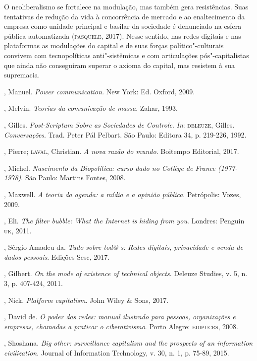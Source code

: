 O neoliberalismo se fortalece na modulação, mas também gera
resistências. Suas tentativas de redução da vida à concorrência de
mercado e ao enaltecimento da empresa como unidade principal e basilar
da sociedade é denunciado na esfera pública automatizada (\textsc{pasquele},
2017). Nesse sentido, nas redes digitais e nas plataformas as modulações
do capital e de suas forças político"-culturais convivem com
tecnopolíticas anti"-sistêmicas e com articulações pós"-capitalistas que
ainda não conseguiram superar o axioma do capital, mas resistem à sua
supremacia.

\begin{bibliohedra}
, Manuel. \emph{Power communication.} New York: Ed. Oxford,
2009.

, Melvin. \emph{Teorias da comunicação de massa}. Zahar, 1993.

, Gilles. \emph{Post-Scriptum Sobre as Sociedades de Controle}. \emph{In}:
\textsc{deleuze}, Gilles. \emph{Conversações}. Trad. Peter Pál Pelbart. São Paulo:
Editora 34, p. 219-226, 1992.

, Pierre; \textsc{laval}, Christian. \emph{A nova razão do mundo}.
Boitempo Editorial, 2017.

, Michel. \emph{Nascimento da Biopolítica: curso dado no
Collège de France (1977-1978)}. São Paulo: Martins Fontes, 2008.

, Maxwell. \emph{A teoria da agenda: a mídia e a opinião
pública}. Petrópolis: Vozes, 2009.

, Eli. \emph{The filter bubble: What the Internet is hiding
from you}. Londres: Penguin \textsc{uk}, 2011.

, Sérgio Amadeu da. \emph{Tudo sobre tod@ s: Redes digitais,
privacidade e venda de dados pessoais}. Edições Sesc, 2017.

, Gilbert. \emph{On the mode of existence of technical
objects}. Deleuze Studies, v. 5, n. 3, p. 407-424, 2011.

, Nick. \emph{Platform capitalism}. John Wiley \& Sons, 2017.

, David de. \emph{O poder das redes: manual ilustrado para
pessoas, organizações e empresas, chamadas a praticar o ciberativismo}.
Porto Alegre: \textsc{edipucrs}, 2008.

, Shoshana. \emph{Big other: surveillance capitalism and the
prospects of an information civilization}. Journal of Information
Technology, v. 30, n. 1, p. 75-89, 2015.\\
\end{bibliohedra}


